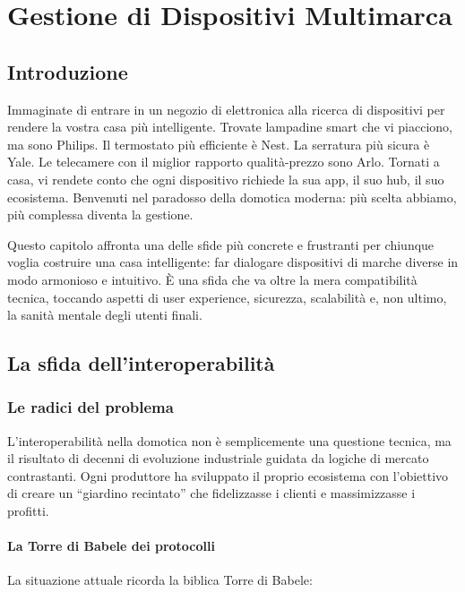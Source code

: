 \chapter{Gestione di Dispositivi Multimarca}

\section{Introduzione}

Immaginate di entrare in un negozio di elettronica alla ricerca di dispositivi per rendere la vostra casa più intelligente. Trovate lampadine smart che vi piacciono, ma sono Philips. Il termostato più efficiente è Nest. La serratura più sicura è Yale. Le telecamere con il miglior rapporto qualità-prezzo sono Arlo. Tornati a casa, vi rendete conto che ogni dispositivo richiede la sua app, il suo hub, il suo ecosistema. Benvenuti nel paradosso della domotica moderna: più scelta abbiamo, più complessa diventa la gestione.

Questo capitolo affronta una delle sfide più concrete e frustranti per chiunque voglia costruire una casa intelligente: far dialogare dispositivi di marche diverse in modo armonioso e intuitivo. È una sfida che va oltre la mera compatibilità tecnica, toccando aspetti di user experience, sicurezza, scalabilità e, non ultimo, la sanità mentale degli utenti finali.

\section{La sfida dell'interoperabilità}

\subsection{Le radici del problema}

L'interoperabilità nella domotica non è semplicemente una questione tecnica, ma il risultato di decenni di evoluzione industriale guidata da logiche di mercato contrastanti. Ogni produttore ha sviluppato il proprio ecosistema con l'obiettivo di creare un ``giardino recintato'' che fidelizzasse i clienti e massimizzasse i profitti.

\subsubsection{La Torre di Babele dei protocolli}

La situazione attuale ricorda la biblica Torre di Babele:

